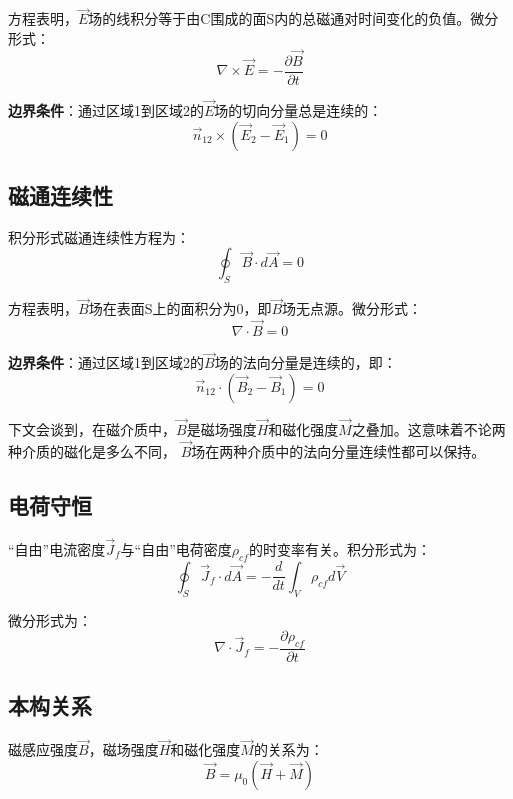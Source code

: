 方程表明，$\vec{E}$场的线积分等于由C围成的面S内的总磁通对时间变化的负值。微分形式：
\begin{equation}\label{eqn:faradaylaw diff}
   \nabla \times \vec{E}=-\frac{\partial{\vec{B}}}{\partial{t}}
\end{equation}

\textbf{边界条件}：通过区域1到区域2的$\vec{E}$场的切向分量总是连续的：
\begin{equation}\label{eqn:faraday bc}
  \vec{n}_{12}\times (\vec{E}_2-\vec{E}_1)=0
\end{equation}

\subsection{磁通连续性}
积分形式磁通连续性方程为：
\begin{equation}\label{eqn:bcontinuelaw}
\oint_S \vec{B}\cdot d\vec{A}=0
\end{equation}

方程表明，$\vec{B}$场在表面S上的面积分为0，即$\vec{B}$场无点源。微分形式：
\begin{equation}\label{eqn:bcontinuelaw diff}
  \nabla \cdot \vec{B}=0
\end{equation}

\textbf{边界条件}：通过区域1到区域2的$\vec{B}$场的法向分量是连续的，即：
\begin{equation}\label{eqn:bcontinuelaw bc}
  \vec{n}_{12}\cdot (\vec{B}_2-\vec{B}_1)=0
\end{equation}

下文会谈到，在磁介质中，$\vec{B}$是磁场强度$\vec{H}$和磁化强度$\vec{M}$之叠加。这意味着不论两种介质的磁化是多么不同，
$\vec{B}$场在两种介质中的法向分量连续性都可以保持。

\subsection{电荷守恒}
“自由”电流密度$\vec{J}_f$与“自由”电荷密度$\rho_{cf}$的时变率有关。积分形式为：
\begin{equation}\label{eqn:chargelaw}
\oint_S \vec{J}_f\cdot d\vec{A}=-\frac{d}{dt}\int_V \rho_{cf}d\vec{V}
\end{equation}

微分形式为：
\begin{equation}\label{eqn:chargelaw diff}
   \nabla \cdot \vec{J}_f=-\frac{\partial{\rho_{cf}}}{\partial{t}}
\end{equation}

\subsection{本构关系}
磁感应强度$\vec{B}$，磁场强度$\vec{H}$和磁化强度$\vec{M}$的关系为：
\begin{equation}\label{eqn:bhm}
\vec{B}=\mu_0(\vec{H}+\vec{M})
\end{equation}

